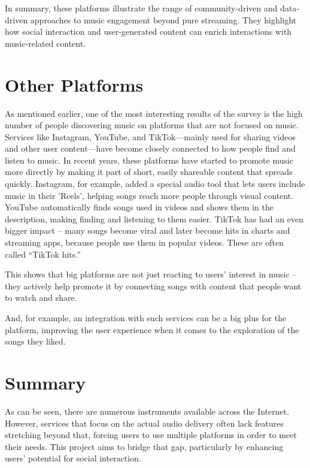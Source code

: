 In summary, these platforms illustrate the range of community-driven and data-driven approaches to music engagement
beyond pure streaming.
They highlight how social interaction and user-generated content can enrich interactions with music-related content.



\section{Other Platforms}

As mentioned earlier, one of the most interesting results of the survey is the high number of people
discovering music on platforms that are not focused on music.
Services like Instagram, YouTube, and TikTok—mainly used for sharing videos and other user content—have
become closely connected to how people find and listen to music.
In recent years, these platforms have started to promote music more directly by making it part of short,
easily shareable content that spreads quickly.
Instagram, for example, added a special audio tool that lets users include music in their 'Reels'\cite{inst_audio},
helping songs reach more people through visual content.
YouTube automatically finds songs used in videos and shows them in the description, making finding and listening to them easier.
TikTok has had an even bigger impact -- many songs become viral and later become hits in charts and streaming apps,
because people use them in popular videos. These are often called “TikTok hits.”

This shows that big platforms are not just reacting to users’ interest in music -- they
actively help promote it by connecting songs with content that people want to watch and share.

And, for example, an integration with such services can be a big plus for the platform, improving the user experience
when it comes to the exploration of the songs they liked.

\section*{Summary}
As can be seen, there are numerous instruments available across the Internet.
However, services that focus on the actual audio delivery often lack features stretching beyond that,
forcing users to use multiple platforms in order to meet their needs. This project aims to bridge that gap,
particularly by enhancing users' potential for social interaction.

